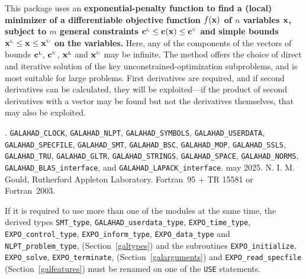 \documentclass{galahad}
\newcommand{\packagename}{EXPO}
\newcommand{\fullpackagename}{\libraryname\_\packagename}
\newcommand{\sL}{\s{L}}
\newcommand{\sU}{\s{U}}
\begin{document}
\galheader


\galsummary
This package uses an {\bf exponential-penalty function to find a (local)
minimizer of a differentiable objective function $f({\mathbf{x}})$
of $n$ variables ${\mathbf{x}}$, subject 
to $m$ general constraints $\bmc\sL \leq \bmc(\bmx) \leq \bmc\sU$
and simple bounds $\bmx\sL \leq \bmx \leq \bmx\sU$ on the variables.}
Here, any of the components of the vectors of bounds 
$\bmc\sL$, $\bmc\sU$, $\bmx\sL$ and $\bmx\sU$ may be infinite. 
The method offers the choice of direct
and iterative solution of the key unconstrained-optimization subproblems, and
is most suitable for large problems. First derivatives are required,
and if second derivatives can be calculated, they will be exploited---if
the product of second derivatives with a vector may be found but
not the derivatives themselves, that may also be exploited.


\galattributes
\galversions{\tt  \fullpackagename\_single, \fullpackagename\_double}.
\galuses
{\tt GALAHAD\_CLOCK},
{\tt GALAHAD\_NLPT},
{\tt GALAHAD\_SY\-M\-BOLS},
{\tt GALAHAD\_USERDATA},
{\tt GALAHAD\_SPECFILE},
{\tt GALAHAD\_SMT},
{\tt GALAHAD\_BSC},
{\tt GALAHAD\_MOP},
{\tt GALAHAD\_\-SSLS},
{\tt GALAHAD\_TRU},
{\tt GALAHAD\_GLTR},
{\tt GALAHAD\_STRINGS},
{\tt GALAHAD\_SPACE},
{\tt GALAHAD\_\-NORMS},
{\tt GALAHAD\_BLAS\_interface},
and
{\tt GALAHAD\_LAPACK\_interface}.
\galdate may 2025.
\galorigin N. I. M. Gould, Rutherford Appleton Laboratory.
\gallanguage Fortran~95 + TR 15581 or Fortran~2003.


\galhowto



\noindent
If it is required to use more than one of the modules at the same time, 
the derived types
{\tt SMT\_type},
{\tt GALAHAD\_userdata\_\-type},
{\tt \packagename\_time\_\-type},
{\tt \packagename\_control\_type},
{\tt \packagename\_inform\_type},
{\tt \packagename\_data\_type}
and
{\tt NLPT\_problem\_type},
(Section~\ref{galtypes})
and the subroutines
{\tt \packagename\_\-initialize},
{\tt \packagename\_\-solve},
{\tt \packagename\_terminate},
(Section~\ref{galarguments})
and
{\tt \packagename\_read\_specfile}
(Section~\ref{galfeatures})
must be renamed on one of the {\tt USE} statements.
\end{document}
